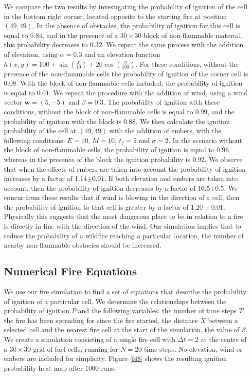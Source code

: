 \noindent We compare the two results by investigating the probability of ignition of the cell in the bottom right corner, located opposite to the starting fire at position $(49,49)$. In the absence of obstacles, the probability of ignition for this cell is equal to $0.84$, and in the presence of a $30 \times 30$ block of non-flammable material, this probability decreases to $0.32$. We repeat the same process with the addition of elevation, using $\alpha = 0.3$ and an elevation function $h(x,y) = 100+\sin(\frac{x}{10})+ 20\cos(\frac{y}{100})$. For these conditions, without the presence of the non-flammable cells the probability of ignition of the corner cell is $0.08$. With the block of non-flammable cells included, the probability of ignition is equal to $0.01$.\newline
\indent We repeat the procedure with the addition of wind, using a wind vector $\mathbf{w}=(5,-5)$ and $\beta=0.3$. The probability of ignition with these conditions, without the block of non-flammable cells is equal to $0.99$, and the probability of ignition with the block is $0.88$. We then calculate the ignition probability of the cell at $(49,49)$ with the addition of embers, with the following conditions: $E=10$, $M=10$, $t_f=5$ and $\sigma=2$. In the scenario without the block of non-flammable cells, the probability of ignition is equal to $0.96$, whereas in the presence of the block the ignition probability is $0.92$. We observe that when the effects of embers are taken into account the probability of ignition increases by a factor of 1.14$\pm0.01$. If both elevation and embers are taken into account, then the probability of ignition decreases by a factor of  10.5$\pm0.5$. \newline \indent We concur from these results that if wind is blowing in the direction of a cell, then the probability of ignition to that cell is greater by a factor of $1.20\pm0.01$. Physically this suggests that the most dangerous place to be in relation to a fire is directly in line with the direction of the wind. Our simulation implies that to reduce the probability of a wildfire reaching a particular location, the number of nearby non-flammable obstacles should be increased. \newpage 
\subsection{Numerical Fire Equations}\label{numericalfire}
We use our fire simulation to find a set of equations that describe the probability of ignition of a particular cell. We determine the relationships between the probability of ignition $P$ and the following variables: the  number of time steps $T$ the fire has been spreading for since the fire started, the distance $X$ between a selected cell and the nearest fire cell at the start of the simulation, the value of $\beta$. We create a simulation consisting of a single fire cell with $\Delta t = 2$  at the centre of a $30\times30$ grid of fuel cells, running for $N=20$ time steps. No elevation, wind or embers are included for simplicity.  Figure \ref{f48} shows the resulting ignition probability heat map after 1000 runs.

